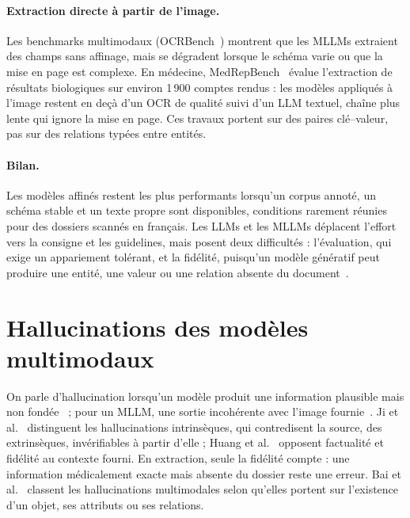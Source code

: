 \paragraph{Extraction directe à partir de l'image.} Les benchmarks multimodaux (OCRBench~\cite{liu2024ocrbench}) montrent que les MLLMs extraient des champs sans affinage, mais se dégradent lorsque le schéma varie ou que la mise en page est complexe. En médecine, MedRepBench~\cite{shang2025medrepbench} évalue l'extraction de résultats biologiques sur environ 1\,900 comptes rendus : les modèles appliqués à l'image restent en deçà d'un OCR de qualité suivi d'un LLM textuel, chaîne plus lente qui ignore la mise en page. Ces travaux portent sur des paires clé--valeur, pas sur des relations typées entre entités.

\paragraph{Bilan.} Les modèles affinés restent les plus performants lorsqu'un corpus annoté, un schéma stable et un texte propre sont disponibles, conditions rarement réunies pour des dossiers scannés en français. Les LLMs et les MLLMs déplacent l'effort vers la consigne et les guidelines, mais posent deux difficultés : l'évaluation, qui exige un appariement tolérant, et la fidélité, puisqu'un modèle génératif peut produire une entité, une valeur ou une relation absente du document~\cite{chen2025benchmarking}.

\section{Hallucinations des modèles multimodaux}\label{sec:c2-hallu}

On parle d'hallucination lorsqu'un modèle produit une information plausible mais non fondée~\cite{ji2023survey,huang2023survey} ; pour un MLLM, une sortie incohérente avec l'image fournie~\cite{bai2025survey}. Ji et al.~\cite{ji2023survey} distinguent les hallucinations intrinsèques, qui contredisent la source, des extrinsèques, invérifiables à partir d'elle ; Huang et al.~\cite{huang2023survey} opposent factualité et fidélité au contexte fourni. En extraction, seule la fidélité compte : une information médicalement exacte mais absente du dossier reste une erreur. Bai et al.~\cite{bai2025survey} classent les hallucinations multimodales selon qu'elles portent sur l'existence d'un objet, ses attributs ou ses relations.

